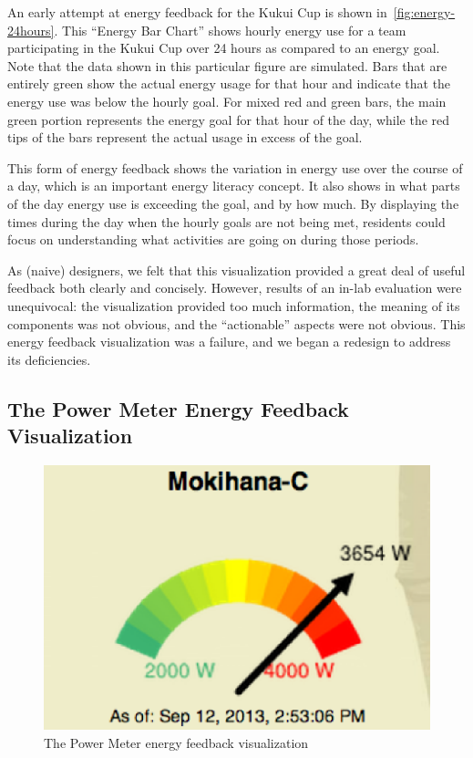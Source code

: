 \documentclass[10pt, conference, compsocconf]{IEEEtran-old}
\begin{document}
An early attempt at energy feedback for the Kukui Cup is shown in~\autoref{fig:energy-24hours}. This ``Energy Bar Chart'' shows hourly energy use for a team participating in the Kukui Cup over 24 hours as compared to an energy goal. Note that the data shown in this particular figure are simulated. Bars that are entirely green show the actual energy usage for that hour and indicate that the energy use was below the hourly goal. For mixed red and green bars, the main green portion represents the energy goal for that hour of the day, while the red tips of the bars represent the actual usage in excess of the goal.

This form of energy feedback shows the variation in energy use over the course of a day, which is an important energy literacy concept. It also shows in what parts of the day energy use is exceeding the goal, and by how much. By displaying the times during the day when the hourly goals are not being met, residents could focus on understanding what activities are going on during those periods.

As (naive) designers, we felt that this visualization provided a great deal of useful feedback both clearly and concisely. However, results of an in-lab evaluation were unequivocal: the visualization provided too much information, the meaning of its components was not obvious, and the ``actionable'' aspects were not obvious. This energy feedback visualization was a failure, and we began a redesign to address its deficiencies.

\subsection{The Power Meter Energy Feedback Visualization}

\begin{figure}[!tb]
	\centering
	\includegraphics[width=0.9\columnwidth]{power-meter.eps}
	\caption{The Power Meter energy feedback visualization}
	\label{fig:power-meter}
\end{figure}
\end{document}
